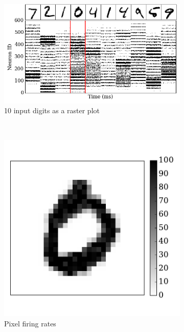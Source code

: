 		\begin{figure}[tbh!]
		\centering
		\begin{subfigure}[t]{0.8\textwidth}
			\includegraphics[width=\textwidth]{pics_iconip/6-1.png}
			\caption{10 input digits as a raster plot}
			\label{Fig:61}
		\end{subfigure}\\
		\begin{subfigure}[t]{0.3\textwidth}
			\includegraphics[width=\textwidth]{pics_iconip/6-2.pdf}
			\caption{Pixel firing rates}
			\label{Fig:62}
		\end{subfigure}
		\begin{subfigure}[t]{0.3\textwidth}

\end{subfigure}
\end{figure}
